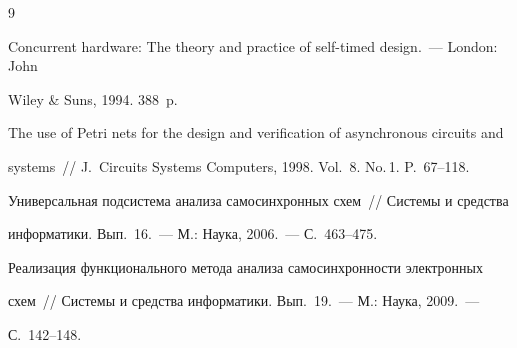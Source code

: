 {\begin{thebibliography}{9}




Concurrent hardware: The theory and practice of self-timed design.~--- London: John 


Wiley \& Suns, 1994.  388~p.









The use of Petri nets for the design and verification of asynchronous circuits and 


systems~// J.~Circuits Systems Computers, 1998.  Vol.~8.  No.\,1. P.~67--118.









Универсальная подсистема анализа самосинхронных схем~// Системы и средства 


информатики. Вып.~16.~--- М.: Наука, 2006.~--- С.~463--475.









Реализация функционального метода анализа самосинхронности электронных 


схем~// Системы и средства информатики. Вып.~19.~--- М.: Наука, 2009.~--- 


С.~142--148.


\end{thebibliography}


}


 


